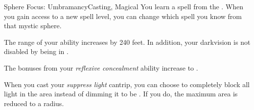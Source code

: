 \begin{feat}{Sphere Focus: Umbramancy}{Casting, Magical}
         You learn a spell from the  .
        When you gain access to a new spell level, you can change which spell you know from that mystic sphere.

         The range of your  ability increases by 240 feet.
        In addition, your darkvision is not disabled by being in .

          The bonuses from your \textit{reflexive concealment} ability increase to .

         When you cast your \textit{suppress light} cantrip, you can choose to completely block all light in the area instead of dimming it to be .
        If you do, the maximum area is reduced to a \medarea radius.
    \end{feat}

